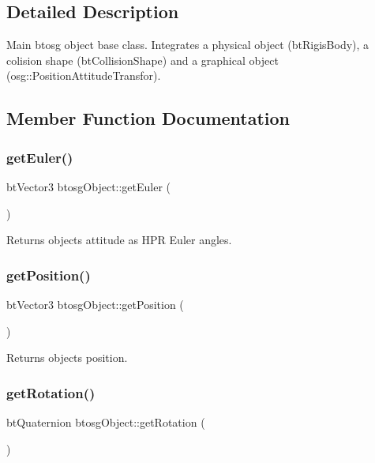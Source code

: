 \subsection{Detailed Description}
Main btosg object base class. Integrates a physical object (bt\+Rigis\+Body), a colision shape (bt\+Collision\+Shape) and a graphical object (osg\+::\+Position\+Attitude\+Transfor). 

\subsection{Member Function Documentation}
\mbox{\label{classbtosgObject_afef1fe06635566ab9cee134f72439e02}} 
\subsubsection{\texorpdfstring{get\+Euler()}{getEuler()}}
{\footnotesize\ttfamily bt\+Vector3 btosg\+Object\+::get\+Euler (\begin{DoxyParamCaption}{ }\end{DoxyParamCaption})\hspace{0.3cm}{\ttfamily [inline]}}

Returns object\textquotesingle{}s attitude as H\+PR Euler angles. \mbox{\label{classbtosgObject_a77a1434498d7a6d00c415042a995d119}} 
\subsubsection{\texorpdfstring{get\+Position()}{getPosition()}}
{\footnotesize\ttfamily bt\+Vector3 btosg\+Object\+::get\+Position (\begin{DoxyParamCaption}{ }\end{DoxyParamCaption})\hspace{0.3cm}{\ttfamily [inline]}}

Returns object\textquotesingle{}s position. \mbox{\label{classbtosgObject_a9cadb03762699412552601196950a039}} 
\subsubsection{\texorpdfstring{get\+Rotation()}{getRotation()}}
{\footnotesize\ttfamily bt\+Quaternion btosg\+Object\+::get\+Rotation (\begin{DoxyParamCaption}{ }\end{DoxyParamCaption})\hspace{0.3cm}{\ttfamily [inline]}}


